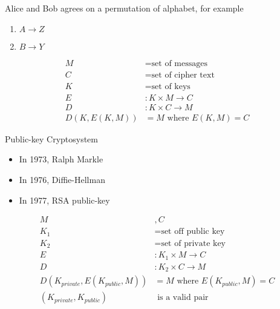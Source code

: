 

\begin{exmp}
    Alice and Bob agrees on a permutation of alphabet, for example
    \begin{enumerate}
        \item $ A \to Z$
        \item $ B \to Y$
    \end{enumerate}
\end{exmp}

\begin{defn}
\begin{align*}
    M &= \text{set of messages}\\
    C &= \text{set of cipher text}\\
    K &= \text{set of keys}\\
    E&: K \times M \to C \\
    D&: K \times C \to M \\
    D(K, E(K, M)) &= M \text{ where } E(K, M) = C
\end{align*}
\end{defn}

\begin{defn}
Public-key Cryptosystem
\begin{itemize}
    \item In 1973, Ralph Markle
    \item In 1976, Diffie-Hellman
    \item In 1977, RSA public-key
\end{itemize}
\end{defn}

\begin{exmp}
\end{exmp}

\begin{defn}
    \begin{align*}
        M&, C\\
        K_1 &= \text{set off public key}\\
        K_2 &= \text{set of private key}\\
        E&: K_1 \times M \to C\\
        D&: K_2 \times C \to M\\
        D(K_{private}, E(K_{public}, M)) &= M \text{ where } E(K_{public}, M) = C\\
        (K_{private}, K_{public}) &\text{ is a valid pair}
    \end{align*}
\end{defn}


